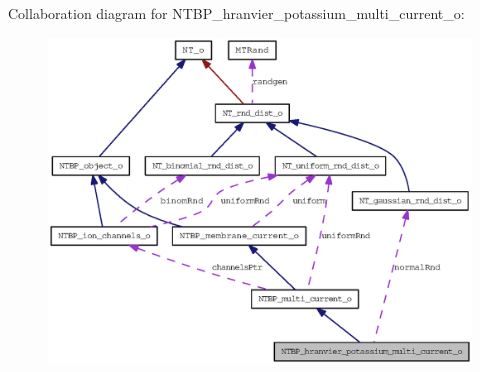 Collaboration diagram for NTBP\_\-hranvier\_\-potassium\_\-multi\_\-current\_\-o:
\nopagebreak
\begin{figure}[H]
\begin{center}
\leavevmode
\includegraphics[width=400pt]{class_n_t_b_p__hranvier__potassium__multi__current__o__coll__graph}
\end{center}
\end{figure}
